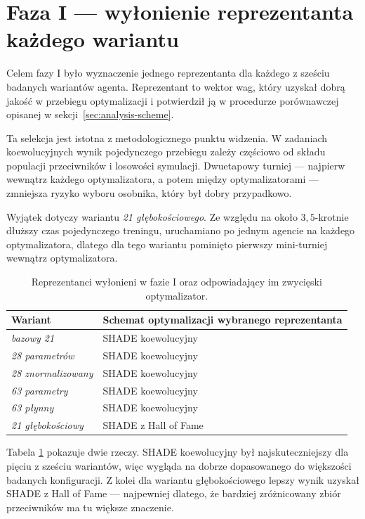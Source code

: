 \section{Faza I — wyłonienie reprezentanta każdego wariantu}
\label{sec:phase1}

Celem fazy I było wyznaczenie jednego reprezentanta dla każdego z sześciu badanych wariantów agenta. Reprezentant to wektor wag, który uzyskał dobrą jakość w przebiegu optymalizacji i potwierdził ją w procedurze porównawczej opisanej w sekcji~\ref{sec:analysis-scheme}.

Ta selekcja jest istotna z metodologicznego punktu widzenia. W zadaniach koewolucyjnych wynik pojedynczego przebiegu zależy częściowo od składu populacji przeciwników i losowości symulacji. Dwuetapowy turniej --- najpierw wewnątrz każdego optymalizatora, a potem między optymalizatorami --- zmniejsza ryzyko wyboru osobnika, który był dobry przypadkowo.

Wyjątek dotyczy wariantu \textit{21 głębokościowego}. Ze względu na około \(3{,}5\)-krotnie dłuższy czas pojedynczego treningu, uruchamiano po jednym agencie na każdego optymalizatora, dlatego dla tego wariantu pominięto pierwszy mini-turniej wewnątrz optymalizatora.

\begin{table}[ht]
\centering
\small
\caption{Reprezentanci wyłonieni w fazie I oraz odpowiadający im zwycięski optymalizator.}
\label{tab:phase1-representatives}
\begin{tabular}{ll}
\toprule
Wariant & Schemat optymalizacji wybranego reprezentanta \\
\midrule
\textit{bazowy 21}          & SHADE koewolucyjny \\
\textit{28 parametrów}      & SHADE koewolucyjny \\
\textit{28 znormalizowany}  & SHADE koewolucyjny \\
\textit{63 parametry}       & SHADE koewolucyjny \\
\textit{63 płynny}          & SHADE koewolucyjny \\
\textit{21 głębokościowy}   & SHADE z Hall of Fame \\
\bottomrule
\end{tabular}
\end{table}

Tabela \ref{tab:phase1-representatives} pokazuje dwie rzeczy. SHADE koewolucyjny był najskuteczniejszy dla pięciu z sześciu wariantów, więc wygląda na dobrze dopasowanego do większości badanych konfiguracji. Z kolei dla wariantu głębokościowego lepszy wynik uzyskał SHADE z Hall of Fame --- najpewniej dlatego, że bardziej zróżnicowany zbiór przeciwników ma tu większe znaczenie.

